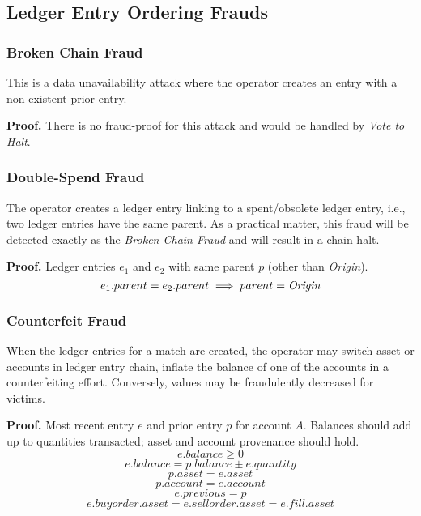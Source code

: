 \documentclass[12pt,a4paper]{article}
\begin{document}
\subsection{Ledger Entry Ordering Frauds}
\subsubsection{Broken Chain Fraud}\label{fp:bc}
This is a data unavailability attack where the operator creates an entry with a non-existent prior entry.

\textbf{Proof.} There is no fraud-proof for this attack and would be handled by \emph{Vote to Halt}.
\subsubsection{Double-Spend Fraud}\label{fp:dsf}
The operator creates a ledger entry linking to a spent/obsolete ledger entry, i.e., two ledger entries have the same parent. As a practical matter, this fraud will be detected exactly as the \emph{Broken Chain Fraud} and will result in a chain halt.

\textbf{Proof.} Ledger entries $e_1$ and $e_2$ with same parent $p$ (other than \emph{Origin}).
\begin{equation}
    e_1.parent = e_2.parent \implies parent = \emph{Origin}
\end{equation}
\subsubsection{Counterfeit Fraud} \label{fp:cff}
When the ledger entries for a match are created, the operator may switch asset or accounts in ledger entry chain, inflate the balance of one of the accounts in a counterfeiting effort. Conversely, values may be fraudulently decreased for victims.

\textbf{Proof.}
Most recent entry $e$ and prior entry $p$ for account $A$. Balances should add up to quantities transacted; asset and account provenance should hold.
\begin{equation}e.balance \geq 0\end{equation}
\begin{equation}
  e.balance = p.balance \pm e.quantity
\end{equation}
\begin{equation}p.asset = e.asset\end{equation}
\begin{equation}p.account = e.account\end{equation}
\begin{equation}e.previous = p\end{equation}
\begin{equation}
e.buyorder.asset = e.sellorder.asset = e.fill.asset
\end{equation}
\end{document}
